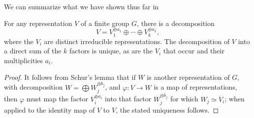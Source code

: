 We can summarize what we have shown thus far in
\begin{proposition}
  For any representation $V$ of a finite group $G$, there is a
  decomposition
  \[
    V=V_1^{\oplus a_1}\oplus\dotsb\oplus V_k^{\oplus a_k},
  \]
  where the $V_i$ are distinct irreducible representations. The
  decomposition of $V$ into a direct sum of the $k$ factors is unique, as
  are the $V_i$ that occur and their multiplicities $a_i$.
\end{proposition}
\begin{proof}
It follows from Schur's lemma that if $W$ is another representation of $G$,
with decomposition $W=\bigoplus W_j^{\oplus b_j}$, and $\varphi\colon V\to
W$ is a map of representations, then $\varphi$ must map the factor
$V_i^{\oplus a_i}$ into that factor $W_j^{\oplus b_j}$ for which $W_j\simeq
V_i$; when applied to the identity map of $V$ to $V$, the stated uniqueness
follows.
\end{proof}

